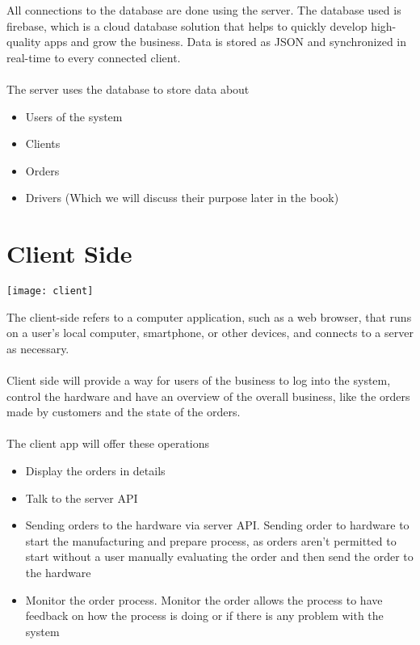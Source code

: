 All connections to the database are done using the server. The database used is firebase, which is a
cloud database solution that helps to quickly develop high-quality apps and grow the business. Data is
stored as JSON and synchronized in real-time to every connected client.\\\\
The server uses the database to store data about
\begin{itemize}
    \item Users of the system
    \item Clients
    \item Orders
    \item Drivers (Which we will discuss their purpose later in the book)
\end{itemize}

\section{Client Side}

\begin{center}
    \texttt{[image: client]}
\end{center}
The client-side refers to a computer application, such as a web browser, that runs on a user's local
computer, smartphone, or other devices, and connects to a server as necessary.\\\\
Client side will provide a way for users of the business to log into the system, control the hardware
and have an overview of the overall business, like the orders made by customers and the state of the
orders.\\\\
The client app will offer these operations
\begin{itemize}
    \item Display the orders in details
    \item Talk to the server API
    \item Sending orders to the hardware via server API. Sending order to hardware to start the
    manufacturing and prepare process, as orders aren’t permitted to start without a user manually
    evaluating the order and then send the order to the hardware
    \item Monitor the order process. Monitor the order allows the process to have feedback on how the
    process is doing or if there is any problem with the system
\end{itemize}

